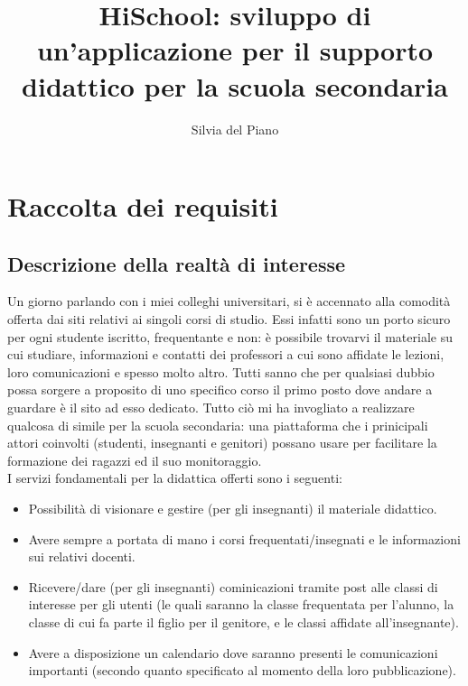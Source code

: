 \documentclass[Lau, binding=0.6cm, oneside]{sapthesis}
\title{HiSchool: sviluppo di un'applicazione per il supporto didattico per la scuola secondaria}
\author{Silvia del Piano}
\begin{document}
\frontmatter

\maketitle

\dedication{Da vedere}

\tableofcontents

\mainmatter

\chapter{Raccolta dei requisiti}

\section{Descrizione della realtà di interesse}

Un giorno parlando con i miei colleghi universitari, si è accennato alla comodità offerta dai siti relativi ai singoli corsi di studio. Essi infatti sono un porto sicuro per ogni studente iscritto, frequentante e non: è possibile trovarvi il materiale su cui studiare, informazioni e contatti dei professori a cui sono affidate le lezioni, loro comunicazioni e spesso molto altro. Tutti sanno che per qualsiasi dubbio possa sorgere a proposito di uno specifico corso il primo posto dove andare a guardare è il sito ad esso dedicato. Tutto ciò mi ha invogliato a realizzare qualcosa di simile per la scuola secondaria: una piattaforma che i prinicipali attori coinvolti (studenti, insegnanti e genitori) possano usare per facilitare la formazione dei ragazzi ed il suo monitoraggio.\\
I servizi fondamentali per la didattica offerti sono i seguenti:
\begin{itemize}
	\item Possibilità di visionare e gestire (per gli insegnanti) il materiale didattico.
	\item Avere sempre a portata di mano i corsi frequentati/insegnati e le informazioni sui relativi docenti.
	\item Ricevere/dare (per gli insegnanti) cominicazioni tramite post alle classi di interesse per gli utenti (le quali saranno la classe frequentata per l'alunno, la classe di cui fa parte il figlio per il genitore, e le classi affidate all'insegnante).
	\item Avere a disposizione un calendario dove saranno presenti le comunicazioni importanti (secondo quanto specificato al momento della loro pubblicazione).
\end{itemize}
\end{document}
